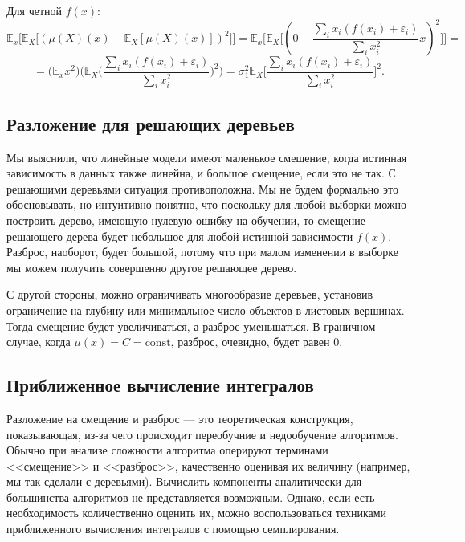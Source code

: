 \documentclass[12pt,fleqn]{article}
\begin{document}
\begin{esSolution}
    	Для четной $f(x)$:
    	\[
    	\mathbb{E}_{x}\bigl[\mathbb{E}_{X}\bigl[(\mu(X)(x) - \mathbb{E}_{X}[\mu(X)(x)] )^2\bigr]\bigr] = 
    	\mathbb{E}_{x}\bigl[\mathbb{E}_{X}\bigl[( 0 -
    	\frac{\sum_i x_i (f(x_i)+\varepsilon_i)}{\sum_i x_i^2} x
    	)^2\bigr]\bigr] =
    	\]
    	\[ =\biggl( \mathbb{E}_{x} x^2 \biggr) 
    	\biggl (\mathbb{E}_{X}\biggl(
    	\frac{\sum_i x_i (f(x_i)+\varepsilon_i)}{\sum_i x_i^2}
    	\biggr )^2\biggr) = \sigma_1^2
    	\mathbb{E}_{X}\biggl[
    	\frac{\sum_i x_i (f(x_i)+\varepsilon_i)}{\sum_i x_i^2}
    	\biggr ]^2.
    	\]
    \end{esSolution}
    
    \subsection{Разложение для решающих деревьев}
    Мы выяснили, что линейные модели имеют маленькое смещение, когда истинная зависимость в данных также линейна, и большое смещение, если это не так.
    С решающими деревьями ситуация противоположна. Мы не будем формально это обосновывать, но интуитивно понятно, что поскольку для любой выборки можно построить дерево, имеющую нулевую ошибку на обучении, то смещение решающего дерева будет небольшое для любой истинной зависимости $f(x)$. Разброс, наоборот, будет большой, потому что при малом изменении в выборке мы можем получить совершенно другое решающее дерево. 
    
    С другой стороны, можно ограничивать многообразие деревьев, установив ограничение на глубину или минимальное число объектов в листовых вершинах. Тогда смещение будет увеличиваться, а разброс уменьшаться. 
    В граничном случае, когда $\mu(x) = C = \text{const}$, разброс, очевидно, будет равен 0.
    
    \subsection{Приближенное вычисление интегралов}
    Разложение на смещение и разброс --- это теоретическая конструкция, показывающая, из-за чего происходит переобучние и недообучение алгоритмов. Обычно при анализе сложности алгоритма оперируют терминами <<смещение>> и <<разброс>>, качественно оценивая их величину (например, мы так сделали с деревьями). Вычислить компоненты аналитически для большинства алгоритмов не представляется возможным. Однако, если есть необходимость количественно оценить их, можно воспользоваться техниками приближенного вычисления интегралов с помощью семплирования.
    
\end{document}

